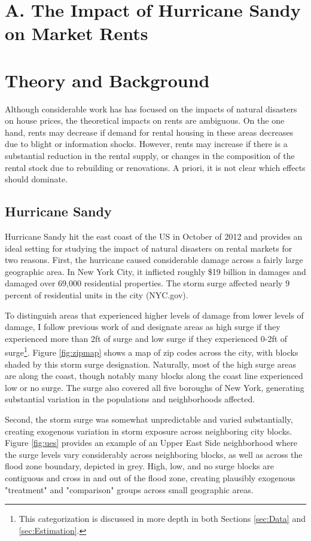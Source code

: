 \documentclass[12pt]{article}
\begin{document}
\section*{A. The Impact of Hurricane Sandy on Market Rents}
\section{Theory and Background}{\label{sec:Theory}

Although considerable work has has focused on the impacts of natural disasters on house prices, the theoretical impacts on rents are ambiguous. On the one hand, rents may decrease if demand for rental housing in these areas decreases due to blight or information shocks.  However, rents may increase if there is a substantial reduction in the rental supply, or changes in the composition of the rental stock due to rebuilding or renovations.  A priori, it is not clear which effects should dominate. 

\subsection{Hurricane Sandy}{\label{sec:sandy}
 Hurricane Sandy hit the east coast of the US in October of 2012 and provides an ideal setting for studying the impact of natural disasters on rental markets for two reasons.  First, the hurricane caused considerable damage across a fairly large geographic area.  In New York City, it inflicted roughly \$19 billion in damages and damaged over 69,000 residential properties.  The storm surge affected nearly 9 percent of residential units in the city (NYC.gov).  

  To distinguish areas that experienced higher levels of damage from lower levels of damage, I follow previous work of \cite{ellen_heterogeneity_2022} and designate areas as high surge if they experienced more than 2ft of surge and low surge if they experienced 0-2ft of surge\footnote{This categorization is discussed in more depth in both Sections \ref{sec:Data} and \ref{sec:Estimation}.}.  Figure \ref{fig:zipmap} shows a map of zip codes across the city, with blocks shaded by this storm surge designation. Naturally, most of the high surge areas are along the coast, though notably many blocks along the coast line experienced low or no surge. The surge also covered all five boroughs of New York, generating substantial variation in the populations and neighborhoods affected.
  
  Second, the storm surge was somewhat unpredictable and varied substantially, creating exogenous variation in storm exposure across neighboring city blocks. Figure \ref{fig:ues} provides an example of an Upper East Side neighborhood where the surge levels vary considerably across neighboring blocks, as well as across the flood zone boundary, depicted in grey.  High, low, and no surge blocks are contiguous and cross in and out of the flood zone, creating plausibly exogenous "treatment" and "comparison" groups across small geographic areas.

}}
\end{document}
